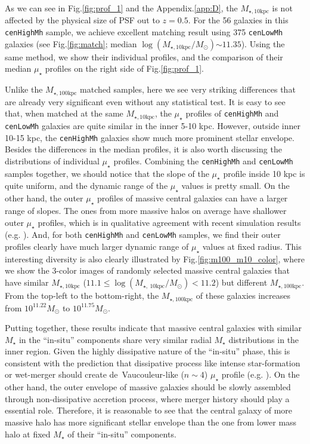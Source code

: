 \documentclass{emulateapj}
\def\rbcg{\texttt{cenHighMh}}
\def\nbcg{\texttt{cenLowMh}}
\def\mstar{{$M_{\star}$}}
\def\minn{{$M_{\star,10\mathrm{kpc}}$}}
\def\mtot{{$M_{\star,100\mathrm{kpc}}$}}
\def\logminn{{$\log (M_{\star,10\mathrm{kpc}}/M_{\odot})$}}
\def\mden{{$\mu_{\star}$}}
\newcommand{\update}[1]{\textcolor{Bittersweet}{#1}}
\begin{document}
\begin{CJK*}{UTF8}{gbsn}
    \update{
    As we can see in Fig.\ref{fig:prof_1} and the Appendix.\ref{app:D}, the \minn{} is 
    not affected by the physical size of PSF out to $z=0.5$.  
    For the 56 galaxies in this \rbcg{} sample, we achieve excellent matching 
    result using 375 \nbcg{} galaxies (see Fig.\ref{fig:match}; 
    median \logminn{}$\sim 11.35$).  
    Using the same method, we show their individual profiles, and the comparison of 
    their median \mden{} profiles on the right side of Fig.\ref{fig:prof_1}.}
    
    Unlike the \mtot{} matched samples, here we see very striking differences that 
    are already very significant even without any statistical test.     
    \update{
    It is easy to see that, when matched at the same \minn{}, the \mden{} profiles of 
    \rbcg{} and \nbcg{} galaxies are quite similar in the inner 5-10 kpc.
    However, outside inner 10-15 kpc, the \rbcg{} galaxies show much more prominent
    stellar envelope.}     
    Besides the differences in the median profiles, it is also worth discussing 
    the distributions of individual \mden{} profiles. 
    \update{
    Combining the \rbcg{} and \nbcg{} samples together, we should notice that 
    the slope of the \mden{} profile inside 10 kpc is quite uniform, and the dynamic 
    range of the \mden{} values is pretty small. 
    On the other hand, the outer \mden{} profiles of massive central galaxies 
    can have a larger range of slopes. 
    The ones from more massive halos on average have shallower outer \mden{} 
    profiles, which is in qualitative agreement with recent simulation results 
    (e.g. \citealt{Pillepich2014}).
    And, for both \rbcg{} and \nbcg{} samples, we find their outer profiles 
    clearly have much larger dynamic range of \mden{} values at fixed radius.
    This interesting diversity is also clearly illustrated by 
    Fig.\ref{fig:m100_m10_color}, where we show the 3-color images of randomly 
    selected massive central galaxies that have similar \minn{} 
    ($11.1 \leq \log (M_{\star,\ 10\mathrm{kpc}}/M_{\odot}) < 11.2$)
    but different \mtot{}.   
    From the top-left to the bottom-right, the \mtot{} of these galaxies increases
    from $10^{11.22} M_{\odot}$ to $10^{11.75} M_{\odot}$.}
    
    \update{
    Putting together, these results indicate that massive central galaxies with 
    similar \mstar{} in the ``in-situ'' components share very similar radial 
    \mstar{} distributions in the inner region. 
    Given the highly dissipative nature of the ``in-situ'' phase, this is consistent
    with the prediction that dissipative process like intense star-formation or 
    wet-merger should create de~Vaucouleur-like ($n\sim 4$) \mden{} profile
    (e.g. \citealt{Hopkins2008}).
    On the other hand, the outer envelope of massive galaxies should be slowly 
    assembled through non-dissipative accretion process, where merger history 
    should play a essential role.  
    Therefore, it is reasonable to see that the central galaxy of more massive 
    halo has more significant stellar envelope than the one from lower mass 
    halo at fixed \mstar{} of their ``in-situ'' components.
    }
    

\end{CJK*}
\end{document}
